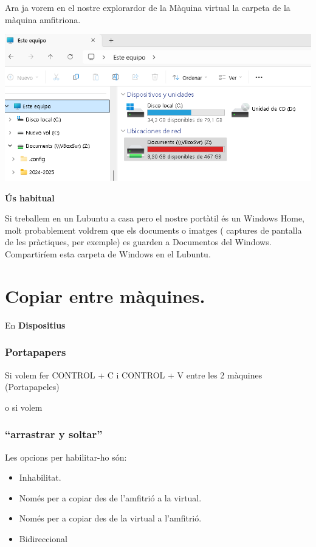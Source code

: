 \documentclass[
  12 pt,
  a4paper,
]{article}
\providecommand{\tightlist}{%
  \setlength{\itemsep}{0pt}\setlength{\parskip}{0pt}}
\begin{document}
Ara ja vorem en el nostre explorardor de la Màquina virtual la carpeta
de la màquina amfitriona.

\includegraphics{png/explorador.png}

\textbf{Ús habitual}

Si treballem en un Lubuntu a casa pero el nostre portàtil és un Windows
Home, molt probablement voldrem que els documents o imatges ( captures
de pantalla de les pràctiques, per exemple) es guarden a Documentos del
Windows. Compartiríem esta carpeta de Windows en el Lubuntu.

\newpage

\section{Copiar entre màquines.}\label{copiar-entre-muxe0quines.}

En \textbf{Dispositius}

\subsubsection{Portapapers}\label{portapapers}

Si volem fer CONTROL + C i CONTROL + V entre les 2 màquines
(Portapapeles)

o si volem

\subsubsection{``arrastrar y soltar''}\label{arrastrar-y-soltar}

Les opcions per habilitar-ho són:

\begin{itemize}
\tightlist
\item
  Inhabilitat.
\item
  Només per a copiar des de l'amfitrió a la virtual.
\item
  Només per a copiar des de la virtual a l'amfitrió.
\item
  Bidireccional
\end{itemize}
\end{document}
